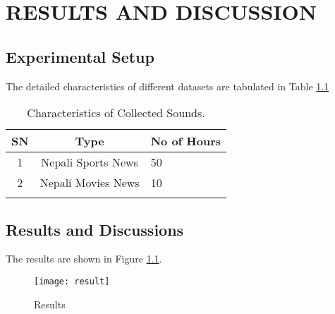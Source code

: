 \chapter{RESULTS AND DISCUSSION}
\section{Experimental Setup}
The detailed characteristics of different datasets are tabulated in Table \ref{tbl:data} \newline

\begin{table}[ht]
\centering
 \caption{Characteristics of Collected Sounds.}
 \label{tbl:data}
\begin{tabular}{|c|c|p{6cm}|}
  \hline
  \textbf{SN} & \textbf{Type} & \textbf{No of Hours} \\ 
  \hline
 1 & Nepali Sports News   & 50 \\
  \hline
 2 & Nepali Movies News   & 10 \\ \\
  \hline
\end{tabular}
\end{table}


\section{ Results and Discussions}
The results are shown in Figure \ref{fig:results}.  

\begin{figure}[ht]
\centering
\texttt{[image: result]}
\caption{Results}
\label{fig:results}
\end{figure}

